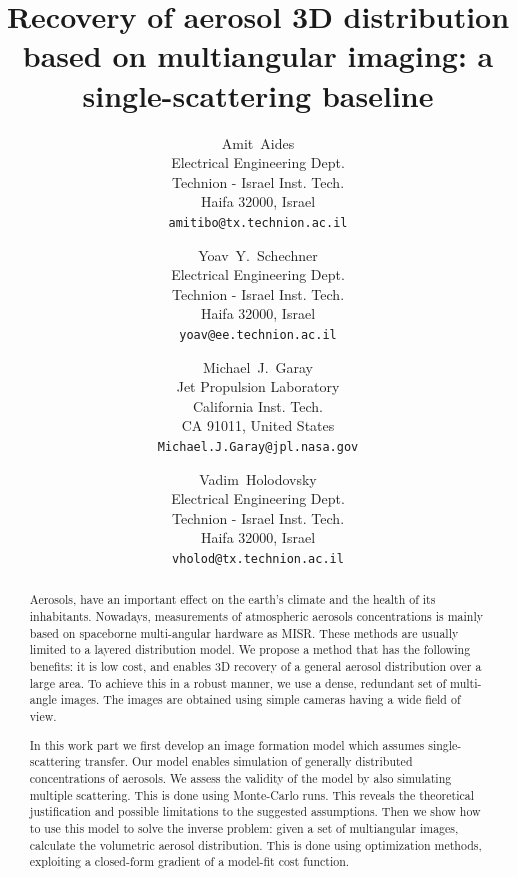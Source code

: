 \documentclass[10pt,twocolumn,letterpaper]{article}
\begin{document}
\title{Recovery of aerosol 3D distribution based on multiangular imaging: a single-scattering baseline}

\author{Amit~Aides\\
Electrical Engineering Dept.\\
Technion - Israel Inst. Tech.\\
Haifa 32000, Israel\\
{\tt\small amitibo@tx.technion.ac.il}
\and
Yoav~Y.~Schechner\\
Electrical Engineering Dept.\\
Technion - Israel Inst. Tech.\\
Haifa 32000, Israel\\
{\tt\small yoav@ee.technion.ac.il}
\and
Michael~J.~Garay\\
Jet Propulsion Laboratory\\
California Inst. Tech.\\
CA 91011, United States\\
{\tt\small Michael.J.Garay@jpl.nasa.gov}
\and
Vadim~Holodovsky\\
Electrical Engineering Dept.\\
Technion - Israel Inst. Tech.\\
Haifa 32000, Israel\\
{\tt\small vholod@tx.technion.ac.il}
}

\maketitle
\thispagestyle{empty}

\begin{abstract}
  Aerosols, have an important effect on the earth's climate and the
  health of its inhabitants. Nowadays, measurements of atmospheric
  aerosols concentrations is mainly based on spaceborne multi-angular
  hardware as MISR. These methods are usually limited to a layered
  distribution model. We propose a method that has the following
  benefits: it is low cost, and enables 3D recovery of a general
  aerosol distribution over a large area.  To achieve this in a robust
  manner, we use a dense, redundant set of multi-angle images. The
  images are obtained using simple cameras having a wide field of
  view.

  In this work part we first develop an image formation model which
  assumes single-scattering transfer.  Our model enables simulation of
  generally distributed concentrations of aerosols.  We assess the
  validity of the model by also simulating multiple scattering. This
  is done using Monte-Carlo runs.  This reveals the theoretical
  justification and possible limitations to the suggested assumptions.
  Then we show how to use this model to solve the inverse problem:
  given a set of multiangular images, calculate the volumetric aerosol
  distribution.  This is done using optimization methods, exploiting a
  closed-form gradient of a model-fit cost function.
\end{abstract}
\end{document}
